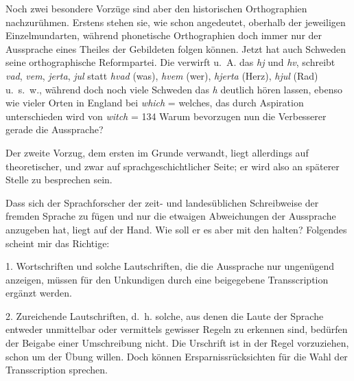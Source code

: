 Noch zwei besondere Vorzüge sind aber den historischen Orthographien nachzurühmen. Erstens stehen sie, wie schon angedeutet, oberhalb der jeweiligen Einzelmundarten, während phonetische Orthographien doch immer nur der Aussprache eines Theiles der Gebildeten folgen können. Jetzt hat auch Schweden seine orthographische Reformpartei. Die verwirft u.~A. das \textit{hj} und \textit{hv}, schreibt \textit{vad}, \textit{vem}, \textit{jerta}, \textit{jul} statt \textit{hvad} (was), \textit{hvem} (wer), \textit{hjerta} (Herz), \textit{hjul} (Rad) u.~s.~w., während doch noch viele Schweden das \textit{h} deutlich hören lassen, ebenso wie vieler Orten \label{fp.143} in England bei \textit{which} = welches, das durch Aspiration unterschieden wird von \textit{witch} =   {\textbar}{\textbar}134{\textbar}{\textbar}\label{sp.134}  Warum bevorzugen nun die Verbesserer gerade die  Aussprache?

Der zweite Vorzug, dem ersten im Grunde verwandt, liegt allerdings auf theoretischer, und zwar auf sprachgeschichtlicher Seite; er wird also an späterer Stelle zu besprechen sein.

Dass sich der Sprachforscher der zeit- und landesüblichen Schreibweise der fremden Sprache zu fügen und nur die etwaigen Abweichungen der Aussprache anzugeben hat, liegt auf der Hand. Wie soll er es aber mit den  halten? Folgendes scheint mir das Richtige:

1. Wortschriften und solche Lautschriften, die die Aussprache nur ungenügend anzeigen, müssen für den Unkundigen durch eine beigegebene Transscription ergänzt werden.

2. Zureichende Lautschriften, d.~h. solche, aus denen die Laute der Sprache entweder unmittelbar oder vermittels gewisser Regeln zu erkennen sind, bedürfen der Beigabe einer Umschreibung nicht. Die Urschrift ist in der Regel vorzuziehen, schon um der Übung willen. Doch können Ersparnissrücksichten für die Wahl der Transscription sprechen. 

